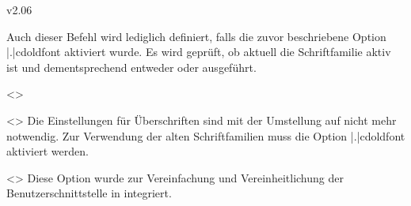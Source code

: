 \begin{Entity}{}
\begin{NoIndexDefault}
\begin{Cessations}{v2.06}
\begin{Cessation}
  {}
\printdeclarationlist
%
Auch dieser Befehl wird lediglich definiert, falls die zuvor beschriebene 
Option \Option|.|{cdoldfont} aktiviert wurde. Es wird geprüft, ob aktuell die 
Schriftfamilie \DIN aktiv ist und dementsprechend entweder  
oder  ausgeführt. 
\end{Cessation}

\begin{Cessation}
  {}
  <>
\begin{Cessation}
  {}
  <>
\printdeclarationlist
%
Die Einstellungen für Überschriften sind mit der Umstellung auf \OpenSans nicht 
mehr notwendig. Zur Verwendung der alten Schriftfamilien muss die Option 
\Option|.|{cdoldfont} aktiviert werden.
\end{Cessation}
\end{Cessation}

\begin{Cessation}
  {}
  <>
\printdeclarationlist
%
Diese Option wurde zur Vereinfachung und Vereinheitlichung der 
Benutzerschnittstelle in  integriert.
\end{Cessation}


\end{Cessations}
\end{NoIndexDefault}
\end{Entity}
